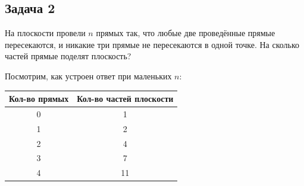 \subsection{Задача 2}

На плоскости провели $n$ прямых так, что любые две проведённые прямые пересекаются, и никакие три прямые не пересекаются в одной точке. На сколько частей прямые поделят плоскость?

Посмотрим, как устроен ответ при маленьких $n$:

\begin{table}[h]
\centering
\begin{tabular}{|c|c|}
\hline
\textbf{Кол-во прямых} & \textbf{Кол-во частей плоскости} \\ \hline
0 & 1 \\ \hline
1 & 2 \\ \hline
2 & 4 \\ \hline
3 & 7 \\ \hline
4 & 11 \\ \hline
\end{tabular}
\end{table}

